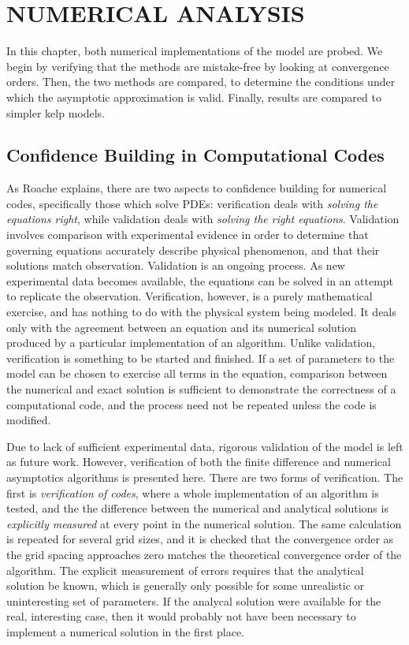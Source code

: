 \chapter{NUMERICAL ANALYSIS}
\label{chap:model_analysis}

In this chapter, both numerical implementations of the model are probed.
We begin by verifying that the methods are mistake-free by looking at convergence orders.
Then, the two methods are compared, to determine the conditions under which the asymptotic
approximation is valid.
Finally, results are compared to simpler kelp models.

\section{Confidence Building in Computational Codes}
As Roache explains, there are two aspects to confidence building for numerical codes, specifically those which solve PDEs:
verification deals with \textit{solving the equations right}, while validation deals with \textit{solving the right equations}.
Validation involves comparison with experimental evidence in order to determine that governing equations
accurately describe physical phenomenon, and that their solutions match observation.
Validation is an ongoing process.
As new experimental data becomes available, the equations can be solved in an attempt to replicate the observation.
Verification, however, is a purely mathematical exercise, and has nothing to do with the physical system being modeled.
It deals only with the agreement between an equation and its numerical solution produced by a particular implementation of an algorithm.
Unlike validation, verification is something to be started and finished.
If a set of parameters to the model can be chosen to exercise all terms in the equation, comparison between the numerical and exact solution is sufficient to demonstrate the correctness of a computational code, and the process need not be repeated unless the code is modified.

Due to lack of sufficient experimental data, rigorous validation of the model is left as future work.
However, verification of both the finite difference and numerical asymptotics algorithms is presented here.
There are two forms of verification.
The first is \textit{verification of codes}, where a whole implementation of an algorithm is tested, and the the difference between the numerical and analytical solutions is \textit{explicitly measured} at every point in the numerical solution.
The same calculation is repeated for several grid sizes, and it is checked that the convergence order as the grid spacing approaches zero matches the theoretical convergence order of the algorithm.
The explicit measurement of errors requires that the analytical solution be known, which is generally only possible for some unrealistic or uninteresting set of parameters.
If the analycal solution were available for the real, interesting case, then it would probably not have been necessary to implement a numerical solution in the first place.

